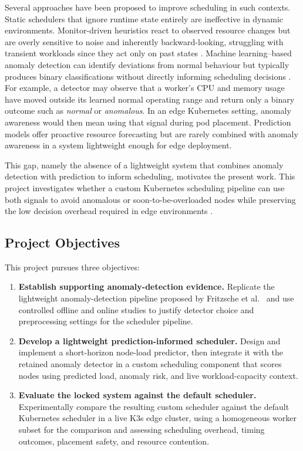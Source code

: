 Several approaches have been proposed to improve scheduling in such contexts. Static schedulers that ignore runtime state entirely are ineffective in dynamic environments. Monitor-driven heuristics react to observed resource changes but are overly sensitive to noise and inherently backward-looking, struggling with transient workloads since they act only on past states \cite{pashaeehir2025kubedsm}. Machine learning--based anomaly detection can identify deviations from normal behaviour but typically produces binary classifications without directly informing scheduling decisions \cite{fritzsche2024lightweight}. For example, a detector may observe that a worker's CPU and memory usage have moved outside its learned normal operating range and return only a binary outcome such as \textit{normal} or \textit{anomalous}. In an edge Kubernetes setting, anomaly awareness would then mean using that signal during pod placement. Prediction models offer proactive resource forecasting but are rarely combined with anomaly awareness in a system lightweight enough for edge deployment.

This gap, namely the absence of a lightweight system that combines anomaly detection with prediction to inform scheduling, motivates the present work. This project investigates whether a custom Kubernetes scheduling pipeline can use both signals to avoid anomalous or soon-to-be-overloaded nodes while preserving the low decision overhead required in edge environments \cite{liu2024dynamic}.

\subsection{Project Objectives}

This project pursues three objectives:

\begin{enumerate}
    \item \textbf{Establish supporting anomaly-detection evidence.} Replicate the lightweight anomaly-detection pipeline proposed by Fritzsche et al.~\cite{fritzsche2024lightweight} and use controlled offline and online studies to justify detector choice and preprocessing settings for the scheduler pipeline.
    
    \item \textbf{Develop a lightweight prediction-informed scheduler.} Design and implement a short-horizon node-load predictor, then integrate it with the retained anomaly detector in a custom scheduling component that scores nodes using predicted load, anomaly risk, and live workload-capacity context.
    
    \item \textbf{Evaluate the locked system against the default scheduler.} Experimentally compare the resulting custom scheduler against the default Kubernetes scheduler in a live K3s edge cluster, using a homogeneous worker subset for the comparison and assessing scheduling overhead, timing outcomes, placement safety, and resource contention.
\end{enumerate}


